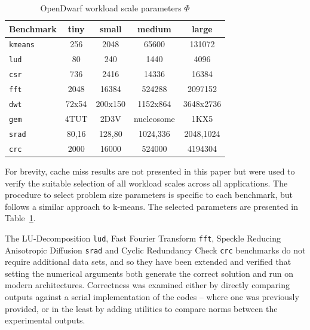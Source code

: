 \documentclass[../document.tex]{subfiles}
\begin{document}
\begin{table}[thb]
\centering
\begin{threeparttable}
    \centering
    \caption{OpenDwarf workload scale parameters $\Phi$}
    \begin{tabular}{l|c|c|c|c}
        \bf Benchmark         & \bf tiny   & \bf small  & \bf medium     & \bf large\\\hline
        {\tt kmeans}          & 256        & 2048   & 65600      & 131072\\
        {\tt lud}             & 80         & 240    & 1440       & 4096\\
        {\tt csr}             & 736        & 2416   & 14336      & 16384\\
        {\tt fft}             & 2048       & 16384  & 524288     & 2097152\\
        {\tt dwt}             & 72x54      & 200x150& 1152x864   & 3648x2736\\       
        {\tt gem}             & 4TUT       & 2D3V   & nucleosome & 1KX5\\
        {\tt srad}            & 80,16      & 128,80 & 1024,336   & 2048,1024\\
        {\tt crc}             & 2000       & 16000  & 524000     & 4194304\\
    \end{tabular}
    \label{tab:problem_sizes}
\end{threeparttable}
\end{table}

For brevity, cache miss results are not presented in this paper but were used to verify the suitable selection of all workload scales across all applications.
The procedure to select problem size parameters is specific to each benchmark, but follows a similar approach to k-means.
The selected parameters are presented in Table~\ref{tab:problem_sizes}.

The LU-Decomposition {\tt lud}, Fast Fourier Transform {\tt fft}, Speckle Reducing Anisotropic Diffusion {\tt srad} and Cyclic Redundancy Check {\tt crc} benchmarks do not require additional data sets, and so they have been extended and verified that setting the numerical arguments both generate the correct solution and run on modern architectures.
Correctness was examined either by directly comparing outputs against a serial implementation of the codes -- where one was previously provided, or in the least by adding utilities to compare norms between the experimental outputs.
\end{document}
